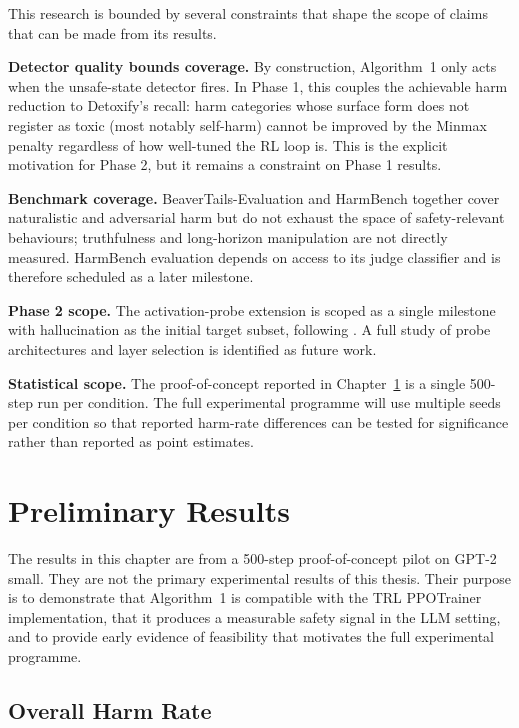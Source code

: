 \documentclass[a4paper,twoside,12pt]{report}
\begin{document}
This research is bounded by several constraints that shape the scope of claims that can be
made from its results.

\textbf{Detector quality bounds coverage.} By construction, Algorithm~1 only acts when the
unsafe-state detector fires. In Phase 1, this couples the achievable harm reduction to
Detoxify's recall: harm categories whose surface form does not register as toxic (most
notably self-harm) cannot be improved by the Minmax penalty regardless of how well-tuned
the RL loop is. This is the explicit motivation for Phase 2, but it remains a constraint on
Phase 1 results.

\textbf{Benchmark coverage.} BeaverTails-Evaluation and HarmBench together cover
naturalistic and adversarial harm but do not exhaust the space of safety-relevant
behaviours; truthfulness and long-horizon manipulation are not directly measured. HarmBench
evaluation depends on access to its judge classifier and is therefore scheduled as a later
milestone.

\textbf{Phase 2 scope.} The activation-probe extension is scoped as a single milestone with
hallucination as the initial target subset, following \citet{rateike2023}. A full study of
probe architectures and layer selection is identified as future work.

\textbf{Statistical scope.} The proof-of-concept reported in Chapter~\ref{ch:prelim} is a
single 500-step run per condition. The full experimental programme will use multiple seeds
per condition so that reported harm-rate differences can be tested for significance rather
than reported as point estimates.

\chapter{Preliminary Results}
\label{ch:prelim}

The results in this chapter are from a 500-step proof-of-concept pilot on GPT-2 small. They
are not the primary experimental results of this thesis. Their purpose is to demonstrate
that Algorithm~1 is compatible with the TRL PPOTrainer implementation, that it produces a
measurable safety signal in the LLM setting, and to provide early evidence of feasibility
that motivates the full experimental programme.

\section{Overall Harm Rate}
\end{document}
